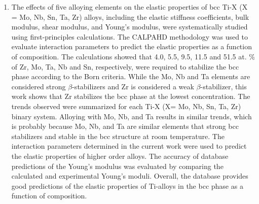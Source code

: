 \begin{enumerate}
	\item The effects of five alloying elements on the elastic properties of bcc Ti-X (X = Mo, Nb, Sn, Ta, Zr) alloys, including the elastic stiffness coefficients, bulk modulus, shear modulus, and Young's modulus, were systematically studied using first-principles calculations. The CALPAHD methodology was used to evaluate interaction parameters to predict the elastic properties as a function of composition. The calculations showed that 4.0, 5.5, 9.5, 11.5 and 51.5 at. \% of Zr, Mo, Ta, Nb and Sn, respectively, were required to stabilize the bcc phase according to the Born criteria. While the Mo, Nb and Ta elements are considered strong $\beta$-stabilizers and Zr is considered a weak $\beta$-stabilizer, this work shows that Zr stabilizes the bcc phase at the lowest concentration. The trends observed were summarized for each Ti-X (X= Mo, Nb, Sn, Ta, Zr) binary system. Alloying with Mo, Nb, and Ta results in similar trends, which is probably because Mo, Nb, and Ta are similar elements that strong bcc stabilizers and stable in the bcc structure at room temperature. The interaction parameters determined in the current work were used to predict the elastic properties of higher order alloys. The accuracy of database predictions of the Young's modulus was evaluated by comparing the calculated and experimental Young's moduli. Overall, the database provides good predictions of the elastic properties of Ti-alloys in the bcc phase as a function of composition.

\end{enumerate}
